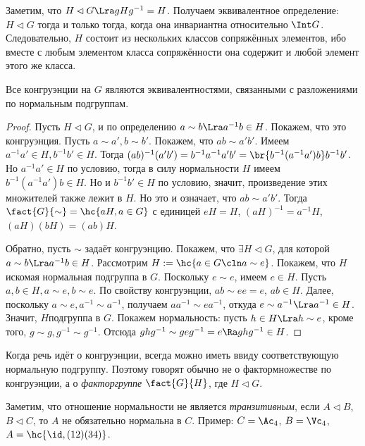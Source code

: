 \documentclass[a4paper]{article}
\begin{document}
Заметим, что $H \lhd G \Lra gHg^{-1}=H$. Получаем эквивалентное определение:  $H\lhd G$ тогда и только тогда,
когда она инвариантна относительно $\Int G$. Следовательно, $H$ состоит из нескольких классов сопряжённых
элементов, ибо вместе с любым элементом класса сопряжённости она содержит и любой элемент этого же класса.

\begin{theorem}
Все конгруэнции на $G$ являются эквивалентностями, связанными с разложениями по нормальным подгруппам.
\end{theorem}
\begin{proof}
 Пусть $H \lhd G$, и по определению $a \sim b \Lra a^{-1}b \in H$. Покажем,  что это конгруэнция. Пусть
$a \sim a', b \sim b'$. Покажем, что $ab \sim a'b'$. Имеем $a^{-1}a' \in H, b^{-1}b' \in H$. Тогда
$(ab)^{-1}(a'b')=b^{-1}a^{-1}a'b'= \br{b^{-1}(a^{-1}a')b}b^{-1}b'$. Но $a^{-1}a' \in H$ по условию, тогда в
силу нормальности $H$ имеем $b^{-1}(a^{-1}a')b \in H$. Но и $b^{-1}b' \in H$ по условию, значит, произведение
этих множителей также лежит в $H$. Но это и означает, что $ab \sim a'b'$. Тогда $\fact{G}{\sim}=\hc{aH, a \in
G}$ с единицей $eH=H$, $(aH)^{-1} = a^{-1}H$, $(aH)(bH)=(ab)H$.

 Обратно, пусть $\sim$ задаёт конгруэнцию. Покажем, что $\exi H \lhd G$,  для которой $a \sim b \Lra
a^{-1}b \in H$. Рассмотрим $H := \hc{a \in G\cln a \sim e}$. Покажем, что $H$\т искомая нормальная подгруппа в
$G$. Поскольку $e \sim e$, имеем $e \in H$. Пусть $a,b\in H, a \sim e, b \sim e$. По свойству конгруэнции,
$ab \sim ee=e$,  $ab \in H$. Далее, поскольку $a \sim e, a^{-1} \sim a^{-1}$, получаем $aa^{-1}\sim
ea^{-1}$, откуда $e \sim a^{-1} \Lra a^{-1} \in H$. Значит, $H$\т подгруппа в $G$. Покажем нормальность:
пусть $h \in H \Lra h \sim e$, кроме того, $g \sim g, g^{-1} \sim g^{-1}$. Отсюда $ghg^{-1} \sim geg^{-1}=e
\Ra ghg^{-1} \in H$.
\end{proof}

\begin{note}
Когда речь идёт о конгруэнции, всегда можно иметь ввиду соответствующую  нормальную подгруппу. Поэтому
говорят обычно не о фактормножестве по конгруэнции, а о \emph{факторгруппе} $\fact{G}{H}$, где $H \lhd G$.
\end{note}

\begin{note}
Заметим, что отношение нормальности не является \emph{транзитивным},  если $A \lhd B$, $B \lhd C$, то $A$
не обязательно нормальна в $C$. Пример: $C = \Ac_4$, $B = \Vc_4$, $A= \hc{\id, (12)(34)}$.
\end{note}
\end{document}
